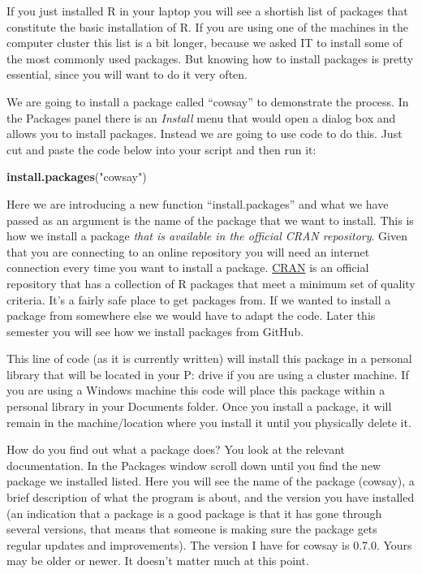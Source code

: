 \documentclass[
]{book}
\newenvironment{Shaded}{\begin{snugshade}}{\end{snugshade}}
\newcommand{\FunctionTok}[1]{\textcolor[rgb]{0.13,0.29,0.53}{\textbf{#1}}}
\newcommand{\NormalTok}[1]{#1}
\newcommand{\StringTok}[1]{\textcolor[rgb]{0.31,0.60,0.02}{#1}}
\begin{document}
If you just installed R in your laptop you will see a shortish list of packages that constitute the basic installation of R. If you are using one of the machines in the computer cluster this list is a bit longer, because we asked IT to install some of the most commonly used packages. But knowing how to install packages is pretty essential, since you will want to do it very often.

We are going to install a package called ``cowsay'' to demonstrate the process. In the Packages panel there is an \emph{Install} menu that would open a dialog box and allows you to install packages. Instead we are going to use code to do this. Just cut and paste the code below into your script and then run it:

\begin{Shaded}
\begin{Highlighting}[]
\FunctionTok{install.packages}\NormalTok{(}\StringTok{"cowsay"}\NormalTok{)}
\end{Highlighting}
\end{Shaded}

Here we are introducing a new function ``install.packages'' and what we have passed as an argument is the name of the package that we want to install. This is how we install a package \emph{that is available in the official CRAN repository}. Given that you are connecting to an online repository you will need an internet connection every time you want to install a package. \href{https://cran.r-project.org/}{CRAN} is an official repository that has a collection of R packages that meet a minimum set of quality criteria. It's a fairly safe place to get packages from. If we wanted to install a package from somewhere else we would have to adapt the code. Later this semester you will see how we install packages from GitHub.

This line of code (as it is currently written) will install this package in a personal library that will be located in your P: drive if you are using a cluster machine. If you are using a Windows machine this code will place this package within a personal library in your Documents folder. Once you install a package, it will remain in the machine/location where you install it until you physically delete it.

How do you find out what a package does? You look at the relevant documentation. In the Packages window scroll down until you find the new package we installed listed. Here you will see the name of the package (cowsay), a brief description of what the program is about, and the version you have installed (an indication that a package is a good package is that it has gone through several versions, that means that someone is making sure the package gets regular updates and improvements). The version I have for cowsay is 0.7.0. Yours may be older or newer. It doesn't matter much at this point.
\end{document}
